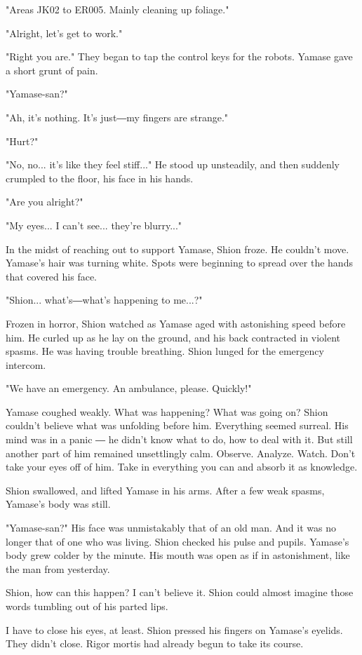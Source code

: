 "Areas JK02 to ER005. Mainly cleaning up foliage."

"Alright, let's get to work."

"Right you are." They began to tap the control keys for the robots.
Yamase gave a short grunt of pain.

"Yamase-san?"

"Ah, it's nothing. It's just―my fingers are strange."

"Hurt?"

"No, no... it's like they feel stiff..." He stood up unsteadily, and
then suddenly crumpled to the floor, his face in his hands.

"Are you alright?"

"My eyes... I can't see... they're blurry..."

In the midst of reaching out to support Yamase, Shion froze. He couldn't
move. Yamase's hair was turning white. Spots were beginning to spread
over the hands that covered his face.

"Shion... what's―what's happening to me...?"

Frozen in horror, Shion watched as Yamase aged with astonishing speed
before him. He curled up as he lay on the ground, and his back
contracted in violent spasms. He was having trouble breathing. Shion
lunged for the emergency intercom.

"We have an emergency. An ambulance, please. Quickly!"

Yamase coughed weakly. What was happening? What was going on? Shion
couldn't believe what was unfolding before him. Everything seemed
surreal. His mind was in a panic ― he didn't know what to do, how to
deal with it. But still another part of him remained unsettlingly calm.
Observe. Analyze. Watch. Don't take your eyes off of him. Take in
everything you can and absorb it as knowledge.

Shion swallowed, and lifted Yamase in his arms. After a few weak spasms,
Yamase's body was still.

"Yamase-san?" His face was unmistakably that of an old man. And it was
no longer that of one who was living. Shion checked his pulse and
pupils. Yamase's body grew colder by the minute. His mouth was open as
if in astonishment, like the man from yesterday.

Shion, how can this happen? I can't believe it. Shion could almost
imagine those words tumbling out of his parted lips.

I have to close his eyes, at least. Shion pressed his fingers on
Yamase's eyelids. They didn't close. Rigor mortis had already begun to
take its course.

